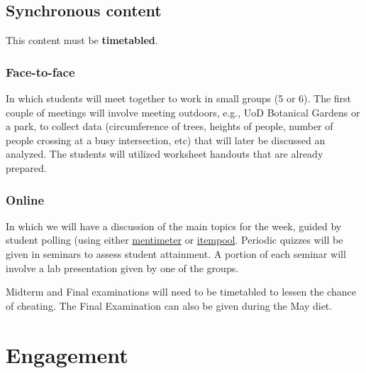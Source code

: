 \documentclass[
]{article}
\providecommand{\tightlist}{%
  \setlength{\itemsep}{0pt}\setlength{\parskip}{0pt}}
\begin{document}
\hypertarget{synchronous-content}{%
\subsection*{Synchronous content}\label{synchronous-content}}

This content must be \textbf{timetabled}.

\hypertarget{face-to-face}{%
\subsubsection*{Face-to-face}\label{face-to-face}}

\begin{description}
\tightlist
\item[Workshops (PRACTICING, COLLABORATING, DISCUSSING)]
In which students will meet together to work in small groups (5 or 6). The first couple of meetings will involve meeting outdoors, e.g., UoD Botanical Gardens or a park, to collect data (circumference of trees, heights of people, number of people crossing at a busy intersection, etc) that will later be discussed an analyzed. The students will utilized worksheet handouts that are already prepared.
\end{description}

\hypertarget{online}{%
\subsubsection*{Online}\label{online}}

\begin{description}
\tightlist
\item[Seminars (DISCUSSING, PRODUCING, PRACTICING)]
In which we will have a discussion of the main topics for the week, guided by student polling (using either \href{https://www.mentimeter.com/}{mentimeter} or \href{https://itempool.com/}{itempool}. Periodic quizzes will be given in seminars to assess student attainment. A portion of each seminar will involve a lab presentation given by one of the groups.
\item[Examinations (PRODUCING)]
Midterm and Final examinations will need to be timetabled to lessen the chance of cheating. The Final Examination can also be given during the May diet.
\end{description}

\hypertarget{engagement}{%
\section{Engagement}\label{engagement}}
\end{document}
